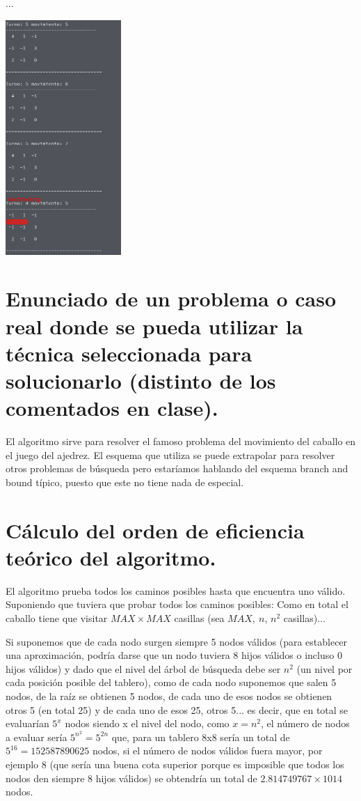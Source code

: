 \documentclass[a4paper, 11pt]{article}
\begin{document}
				...
				
				\includegraphics[width=0.33\textwidth]{d.png}
				



\section{Enunciado de un problema o caso real donde se pueda utilizar la técnica seleccionada para solucionarlo (distinto de los comentados en clase).}
El algoritmo sirve para resolver el famoso problema del movimiento del caballo en el juego del ajedrez. El esquema que utiliza se puede extrapolar para resolver otros problemas de búsqueda pero estaríamos hablando del esquema branch and bound típico, puesto que este no tiene nada de especial.

\section{Cálculo del orden de eficiencia teórico del algoritmo.}

El algoritmo prueba todos los caminos posibles hasta que encuentra uno válido. Suponiendo que tuviera que probar todos los caminos posibles:
Como en total el caballo tiene que visitar $MAX\times MAX$ casillas (sea $MAX,\ n$, $n^2$ casillas)...

Si suponemos que de cada nodo surgen siempre 5 nodos válidos (para establecer una aproximación, podría darse que un nodo tuviera 8 hijos válidos o incluso 0 hijos válidos) y dado que el nivel del árbol de búsqueda debe ser $n^2$ (un nivel por cada posición posible del tablero), como de cada nodo suponemos que salen 5 nodos, de la raíz se obtienen 5 nodos, de cada uno de esos nodos se obtienen otros 5 (en total 25) y de cada uno de esos 25, otros 5... es decir, que en total se evaluarían $5^x$ nodos siendo x el nivel del nodo, como $x=n^2$, el número de nodos a evaluar sería $5^{n^2}=5^{2n}$ que, para un tablero 8x8 sería un total de $5^16=152587890625$ nodos, si el número de nodos válidos fuera mayor, por ejemplo 8 (que sería una buena cota superior porque es imposible que todos los nodos den siempre 8 hijos válidos) se obtendría un total de $2.814749767\times 10{14}$ nodos.
\end{document}
